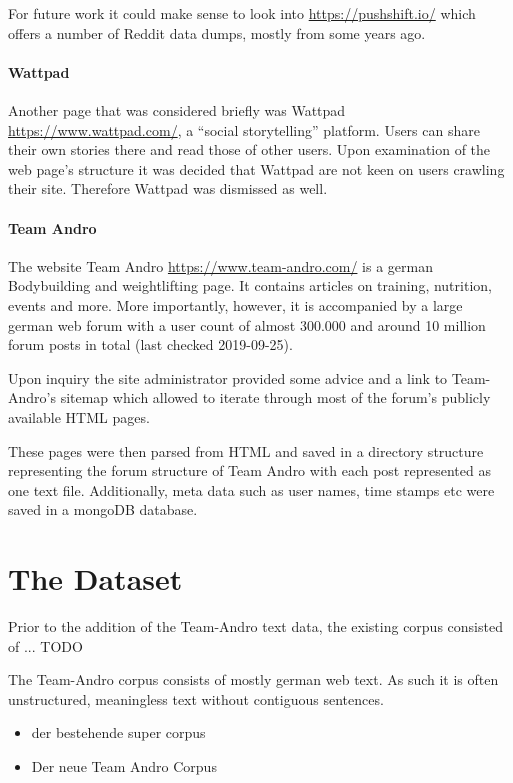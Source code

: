 \documentclass[sigconf,natbib=false]{acmart}
\begin{document}
For future work it could make sense to look into \url{https://pushshift.io/} which offers a number of Reddit data dumps, mostly from some years ago.

\paragraph{Wattpad}

Another page that was considered briefly was Wattpad \url{https://www.wattpad.com/}, a \enquote{social storytelling} platform. Users can share their own stories there and read those of other users. Upon examination of the web page's structure it was decided that Wattpad are not keen on users crawling their site. Therefore Wattpad was dismissed as well.

\paragraph{Team Andro} The website Team Andro \url{https://www.team-andro.com/} is a german Bodybuilding and weightlifting page. It contains articles on training, nutrition, events and more. More importantly, however, it is accompanied by a large german web forum with a user count of almost 300.000 and around 10 million forum posts in total (last checked 2019-09-25).

Upon inquiry the site administrator provided some advice and a link to Team-Andro's sitemap which allowed to iterate through most of the forum's publicly available HTML pages.

These pages were then parsed from HTML and saved in a directory structure representing the forum structure of Team Andro with each post represented as one text file. Additionally, meta data such as user names, time stamps etc were saved in a mongoDB database.


\section{The Dataset}

Prior to the addition of the Team-Andro text data, the existing corpus consisted of ... TODO


The Team-Andro corpus consists of mostly german web text. As such it is often unstructured, meaningless text without contiguous sentences. 

\begin{itemize}
	\item der bestehende super corpus
	\item Der neue Team Andro Corpus
\end{itemize}
\end{document}
